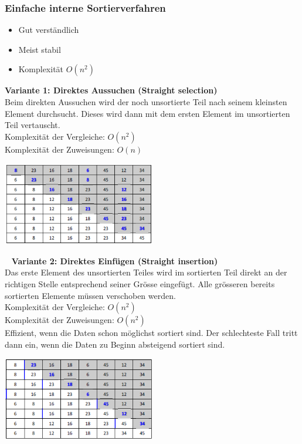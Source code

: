 \subsubsection{Einfache interne Sortierverfahren}
\begin{itemize}
    \item Gut verständlich
    \item Meist stabil
    \item Komplexität $O(n^2)$
\end{itemize}
\textbf{Variante 1: Direktes Aussuchen (Straight selection)}\\
Beim direkten Aussuchen wird der noch unsortierte Teil nach seinem kleinsten Element durchsucht. Dieses wird dann mit dem ersten Element im unsortierten Teil vertauscht.\\
Komplexität der Vergleiche: $O(n^2)$\\
Komplexität der Zuweisungen: $O(n)$\\
\begin{multicols}{2}

\includegraphics[width=0.5\textwidth]{images/Algorithmen/DirektesAussuchen.png}
\end{multicols}
\ \newline
\textbf{Variante 2: Direktes Einfügen (Straight insertion)}\\
Das erste Element des unsortierten Teiles wird im sortierten Teil direkt an der richtigen Stelle entsprechend seiner Grösse eingefügt. Alle grösseren bereits sortierten Elemente müssen verschoben werden.\\
Komplexität der Vergleiche: $O(n^2)$\\
Komplexität der Zuweisungen: $O(n^2)$\\
Effizient, wenn die Daten schon möglichst sortiert sind. Der schlechteste Fall tritt dann ein, wenn die Daten zu Beginn absteigend sortiert sind.
\begin{multicols}{2}

\includegraphics[width=0.5\textwidth]{images/Algorithmen/DirektesEinfuegen.png}
\end{multicols}
